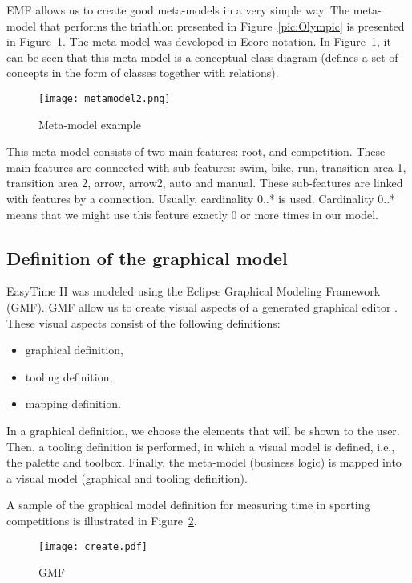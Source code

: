 \documentclass[preprint, prX]{revtex4}
\begin{document}
EMF allows us to create good meta-models in a very simple way. The meta-model that performs the triathlon presented in Figure~\ref{pic:Olympic} is presented in Figure~\ref{pic:meta}. The meta-model was developed in Ecore notation. In Figure~\ref{pic:meta}, it can be seen that this meta-model is a conceptual class diagram (defines a set of concepts in the form of classes together with relations).  

\begin{figure}[htb]
\begin{center}
\texttt{[image: metamodel2.png]} \caption{Meta-model example}
\label{pic:meta}
\end{center}
\vspace{-5mm}
\end{figure}

This meta-model consists of two main features: root, and competition. These main features are connected
with sub features: swim, bike, run, transition area 1, transition area 2, arrow, arrow2, auto
and manual. These sub-features are linked with features by a connection. Usually, cardinality 0..*
is used. Cardinality 0..* means that we might use this feature exactly 0 or more times in
our model. 

\subsection{Definition of the graphical model}

EasyTime II was modeled using the Eclipse Graphical Modeling Framework (GMF). GMF allow us to create visual aspects of a generated graphical editor \cite{ibm}. These visual aspects consist of the following definitions:
\begin{itemize}
\item graphical definition,
\item tooling definition,
\item mapping definition.
\end{itemize}
In a graphical definition, we choose the elements that will be shown to the user. Then, a tooling definition is performed, in which a visual model is defined, i.e., the palette and toolbox. Finally, the meta-model (business logic) is mapped into a visual model (graphical and tooling definition).

A sample of the graphical model definition for measuring time in sporting competitions is illustrated in Figure~\ref{pic:gmf}. 

\begin{figure}[htb]
\begin{center}
\texttt{[image: create.pdf]} \caption{GMF}
\label{pic:gmf}
\end{center}
\vspace{-5mm}
\end{figure}
\end{document}
